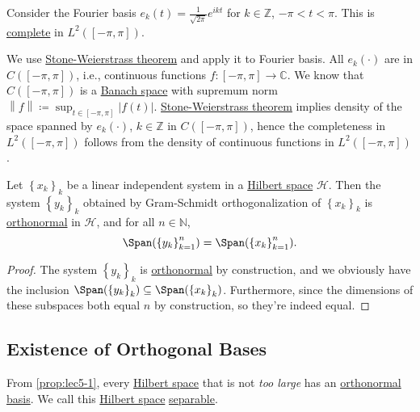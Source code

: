 \begin{eg}
	Consider the Fourier basis \(e_k (t) = \frac{1}{\sqrt{2\pi }} e^{ikt}\) for \(k\in \mathbb{Z } \), \(-\pi < t < \pi \). This is \hyperref[def:complete-system]{complete} in \(L^2([-\pi , \pi ])\).
\end{eg}
\begin{explanation}
	We use \href{https://en.wikipedia.org/wiki/Stone%E2%80%93Weierstrass_theorem}{Stone-Weierstrass theorem} and apply it to Fourier basis. All \(e_k(\cdot)\) are in \(C([-\pi , \pi ])\), i.e., continuous functions \(f\colon [-\pi , \pi ]\to \mathbb{C} \). We know that \(C([-\pi , \pi ])\) is a \hyperref[def:Banach-space]{Banach space} with supremum norm \(\left\lVert f\right\rVert \coloneqq \sup _{t\in [-\pi, \pi ]}\left\vert f(t) \right\vert\). \href{https://en.wikipedia.org/wiki/Stone%E2%80%93Weierstrass_theorem}{Stone-Weierstrass theorem} implies density of the space spanned by \(e_k(\cdot)\), \(k\in \mathbb{Z } \) in \(C([-\pi , \pi ])\), hence the completeness in \(L^2([-\pi , \pi ])\) follows from the density of continuous functions in \(L^2([-\pi , \pi ])\). 
\end{explanation}

\begin{proposition}\label{prop:lec5-1}
	Let \(\left\{ x_k \right\} _k\) be a linear independent system in a \hyperref[def:Hilbert-space]{Hilbert space} \(\mathcal{H}\). Then the system \(\left\{ y_k \right\} _k\) obtained by Gram-Schmidt orthogonalization of \(\left\{ x_k \right\} _k\) is \hyperref[def:orthonormal-system]{orthonormal} in \(\mathcal{H} \), and for all \(n \in \mathbb{N}\),
	\[
		\Span(\left\{ y_k \right\} _{k=1}^n) = \Span(\left\{ x_k \right\} _{k=1}^n).
	\]
\end{proposition}
\begin{proof}
	The system \(\left\{ y_k \right\} _k\) is \hyperref[def:orthonormal-system]{orthonormal} by construction, and we obviously have the inclusion \(\Span(\left\{ y_k \right\} _k) \subseteq \Span(\left\{ x_k \right\} _k)\). Furthermore, since the dimensions of these subspaces both equal \(n\) by construction, so they're indeed equal.
\end{proof}

\subsection{Existence of Orthogonal Bases}
From \autoref{prop:lec5-1}, every \hyperref[def:Hilbert-space]{Hilbert space} that is not \emph{too large} has an \hyperref[def:orthonormal-basis]{orthonormal basis}. We call this \hyperref[def:Hilbert-space]{Hilbert space} \hyperref[def:separable]{separable}.

